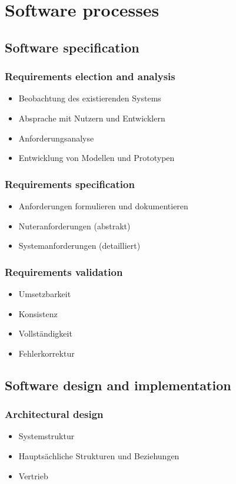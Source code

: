 \section{Software processes}
\subsection{Software specification}
\subsubsection{Requirements election and analysis}
\begin{itemize}
	\item Beobachtung des existierenden Systems
	\item Absprache mit Nutzern und Entwicklern
	\item Anforderungsanalyse
	\item Entwicklung von Modellen und Prototypen
\end{itemize}
\subsubsection{Requirements specification}
\begin{itemize}
	\item Anforderungen formulieren und dokumentieren
	\item Nuteranforderungen (abstrakt)
	\item Systemanforderungen (detailliert)
\end{itemize}
\subsubsection{Requirements validation}
\begin{itemize}
	\item Umsetzbarkeit
	\item Konsistenz
	\item Vollständigkeit
	\item Fehlerkorrektur 
\end{itemize}
\subsection{Software design and implementation}
\subsubsection{Architectural design}
\begin{itemize}
	\item Systemstruktur
	\item Hauptsächliche Strukturen und Beziehungen
	\item Vertrieb
\end{itemize}
